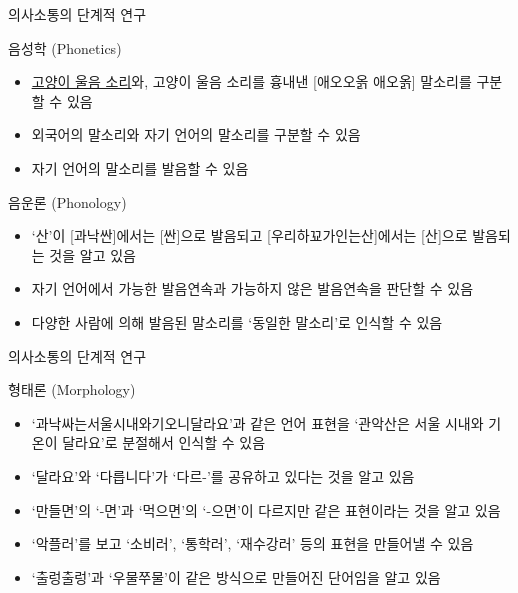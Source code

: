 \documentclass[11pt, aspectratio=169]{beamer}
\begin{document}
\begin{frame}[t]{의사소통의 단계적 연구}
    \begin{block}{음성학 (Phonetics)}
    \begin{itemize}
      \item \href{https://gongu.copyright.or.kr/gongu/wrt/wrt/view.do?wrtSn=13252844&menuNo=200020}{\underline{고양이 울음 소리}}와, 고양이 울음 소리를 흉내낸 [애오오옭 애오옭] 말소리를 구분할 수 있음
      \item 외국어의 말소리와 자기 언어의 말소리를 구분할 수 있음
      \item 자기 언어의 말소리를 발음할 수 있음
    \end{itemize}
  \end{block}

  \begin{block}{음운론 (Phonology)}
    \begin{itemize}
      \item ‘산’이 [과낙싼]에서는 [싼]으로 발음되고 [우리하꾜가인는산]에서는 [산]으로 발음되는 것을 알고 있음 
      \item 자기 언어에서 가능한 발음연속과 가능하지 않은 발음연속을 판단할 수 있음
      \item 다양한 사람에 의해 발음된 말소리를 ‘동일한 말소리’로 인식할 수 있음
    \end{itemize}
    
  \end{block}
\end{frame}

\begin{frame}[t]{의사소통의 단계적 연구}
  \begin{block}{형태론 (Morphology)}
    \begin{itemize}
      \item ‘과낙싸는서울시내와기오니달라요’과 같은 언어 표현을 ‘관악산은 서울 시내와 기온이 달라요’로 분절해서 인식할 수 있음
      \item ‘달라요’와 ‘다릅니다’가 ‘다르-’를 공유하고 있다는 것을 알고 있음
      \item ‘만들면’의 ‘-면’과 ‘먹으면’의 ‘-으면’이 다르지만 같은 표현이라는 것을 알고 있음
      \item ‘악플러’를 보고 ‘소비러’, ‘통학러’, ‘재수강러’ 등의 표현을 만들어낼 수 있음
      \item ‘출렁출렁’과 ‘우물쭈물’이 같은 방식으로 만들어진 단어임을 알고 있음
    \end{itemize}
  \end{block}
\end{frame}
\end{document}
